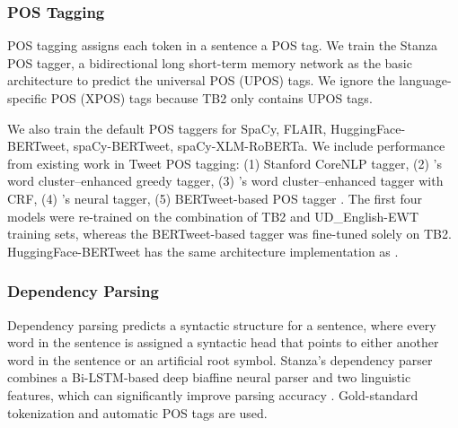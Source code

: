 \documentclass[10pt, a4paper]{article}
\begin{document}
\subsubsection{POS Tagging} 
POS tagging assigns each token in a sentence a POS tag. We train the Stanza POS tagger, a bidirectional long short-term memory network as the basic architecture to predict the universal POS (UPOS) tags. We ignore the language-specific POS (XPOS) tags because TB2 only contains UPOS tags. 

We also train the default POS taggers for SpaCy, FLAIR, HuggingFace-BERTweet, spaCy-BERTweet, spaCy-XLM-RoBERTa. We include performance from existing work in Tweet POS tagging: (1) Stanford CoreNLP tagger, (2) 's word cluster–enhanced greedy tagger, (3) 's word cluster–enhanced tagger with CRF, (4) 's neural tagger, (5) BERTweet-based POS tagger \cite{nguyen2020bertweet}. The first four models were re-trained on the combination of TB2 and UD\_English-EWT  training sets, whereas the BERTweet-based tagger was fine-tuned solely on TB2. HuggingFace-BERTweet has the same architecture implementation as .






\subsubsection{Dependency Parsing}

Dependency parsing predicts a syntactic structure for a sentence, where every word in the sentence is assigned a syntactic head that points to either another word in the sentence or an artificial root symbol. Stanza's dependency parser combines a Bi-LSTM-based deep biaffine neural parser \cite{dozat2016deep} and two linguistic features, which can significantly improve parsing accuracy \cite{qi2019universal}. Gold-standard tokenization and automatic POS tags are used.
\end{document}
